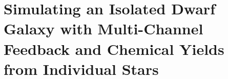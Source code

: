 \chapter[Simulating an Isolated Dwarf Galaxy with Multi-Channel Feedback and Chemical Yields from Individual Stars ]{Simulating an Isolated Dwarf Galaxy with Multi-Channel Feedback and Chemical Yields from Individual Stars \label{ch:chapter1}}
\begingroup
\let\thefootnote\relax{}
\endgroup
%
%
%
%

\newcommand{\ccunit}{cm$^{-3}$}

